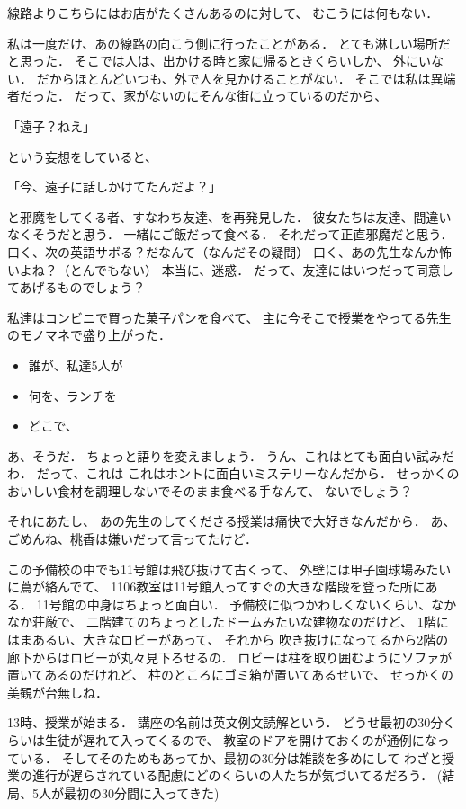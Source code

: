 線路よりこちらにはお店がたくさんあるのに対して、 むこうには何もない．

私は一度だけ、あの線路の向こう側に行ったことがある．
とても淋しい場所だと思った．
そこでは人は、出かける時と家に帰るときくらいしか、 外にいない．
だからほとんどいつも、外で人を見かけることがない．
そこでは私は異端者だった．
だって、家がないのにそんな街に立っているのだから、

「遠子？ねえ」

という妄想をしていると、

「今、遠子に話しかけてたんだよ？」

と邪魔をしてくる者、すなわち友達、を再発見した．
彼女たちは友達、間違いなくそうだと思う． 一緒にご飯だって食べる．
それだって正直邪魔だと思う．
曰く、次の英語サボる？だなんて（なんだその疑問）
曰く、あの先生なんか怖いよね？（とんでもない） 本当に、迷惑．
だって、友達にはいつだって同意してあげるものでしょう？

私達はコンビニで買った菓子パンを食べて、
主に今そこで授業をやってる先生のモノマネで盛り上がった．

\begin{itemize}[<+->]
\itemsep1pt\parskip0pt
\item
  誰が、私達5人が
\item
  何を、ランチを
\item
  どこで、
\end{itemize}

あ、そうだ． ちょっと語りを変えましょう．
うん、これはとても面白い試みだわ． だって、これは
これはホントに面白いミステリーなんだから．
せっかくのおいしい食材を調理しないでそのまま食べる手なんて、
ないでしょう？

それにあたし、 あの先生のしてくださる授業は痛快で大好きなんだから．
あ、ごめんね、桃香は嫌いだって言ってたけど．

この予備校の中でも11号館は飛び抜けて古くって、
外壁には甲子園球場みたいに蔦が絡んでて、
1106教室は11号館入ってすぐの大きな階段を登った所にある．
11号館の中身はちょっと面白い．
予備校に似つかわしくないくらい、なかなか荘厳で、
二階建てのちょっとしたドームみたいな建物なのだけど、
1階にはまあるい、大きなロビーがあって、 それから
吹き抜けになってるから2階の廊下からはロビーが丸々見下ろせるの．
ロビーは柱を取り囲むようにソファが置いてあるのだけれど、
柱のところにゴミ箱が置いてあるせいで、 せっかくの美観が台無しね．

13時、授業が始まる． 講座の名前は英文例文読解という．
どうせ最初の30分くらいは生徒が遅れて入ってくるので、
教室のドアを開けておくのが通例になっている．
そしてそのためもあってか、最初の30分は雑談を多めにして
わざと授業の進行が遅らされている配慮にどのくらいの人たちが気づいてるだろう．
(結局、5人が最初の30分間に入ってきた)

